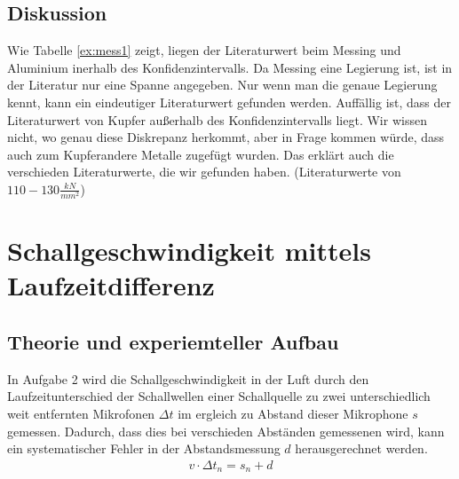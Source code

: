 \documentclass[11pt, a4paper]{article}
\begin{document}
    \subsection{Diskussion}
    Wie Tabelle \ref{ex:mess1} zeigt, liegen der Literaturwert beim Messing und Aluminium inerhalb des Konfidenzintervalls.
    Da Messing eine Legierung ist, ist in der Literatur nur eine Spanne angegeben. Nur wenn man die genaue Legierung kennt,
    kann ein eindeutiger Literaturwert gefunden werden.
    Auffällig ist, dass der Literaturwert von Kupfer außerhalb des Konfidenzintervalls liegt. Wir wissen nicht,
    wo genau diese Diskrepanz herkommt, aber in Frage kommen würde, dass auch zum Kupferandere Metalle zugefügt wurden. Das erklärt auch 
    die verschieden Literaturwerte, die wir gefunden haben. (Literaturwerte von $110-130\frac{kN}{mm^2}$)

    \section{Schallgeschwindigkeit mittels Laufzeitdifferenz}

    \subsection{Theorie und experiemteller Aufbau}
    In Aufgabe 2 wird die Schallgeschwindigkeit in der Luft durch den Laufzeitunterschied der Schallwellen einer Schallquelle zu zwei unterschiedlich
    weit entfernten Mikrofonen $\Delta t$ im ergleich zu Abstand dieser Mikrophone $s$ gemessen. Dadurch, dass dies bei verschieden Abständen gemessenen wird, kann ein systematischer
    Fehler in der Abstandsmessung $d$ herausgerechnet werden.
    \begin{align}
        v \cdot \Delta t_n = s_n + d
    \end{align}
\end{document}
